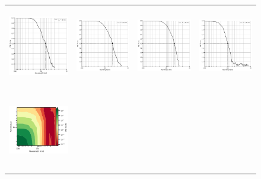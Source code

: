 \begin{figure}[t!]
\begin{center}
\begin{tabular}{cccc}
\includegraphics[trim={0 0 0 0}, clip, width=3.70cm,height=3.5cm]{content/figures/fourdvarnet_figs/osse_gf_nadir_1d_psd_score.png} &
\hspace{1mm}\includegraphics[trim={18mm 0 0 0},clip, width=3.3cm,height=3.5cm]{content/figures/fourdvarnet_figs/osse_gf_nadirswot_1d_psd_score.png} &
\hspace{-4mm}\includegraphics[trim={18mm 0 0 0},clip, width=3.3cm,height=3.5cm]{content/figures/fourdvarnet_figs/osse_gf_nadir_sst_1d_psd_score.png} &
\hspace{-10mm}\includegraphics[trim={18mm 0 0 0},clip,width=3.3cm,height=3.5cm]{content/figures/fourdvarnet_figs/ose_gf_1d_psd_score.png} \\
\hspace{-4mm}\includegraphics[trim={0 0 23mm 0},clip, width=3.65cm,height=3.5cm]{content/figures/fourdvarnet_figs/osse_gf_nadir_psd_spacetime.png} &

\end{tabular}
\end{center}
\end{figure}
